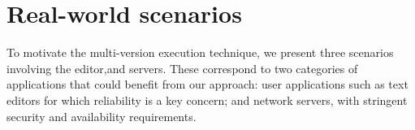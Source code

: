 \section{Real-world scenarios}
\label{multi-version:scenarios}

To motivate the multi-version execution technique, we present three scenarios
involving the \vim editor,\lighttpd and \redis servers.  These correspond to
two categories of applications that could benefit from our approach: user
applications such as text editors for which reliability is a key concern; and
network servers, with stringent security and availability requirements.




